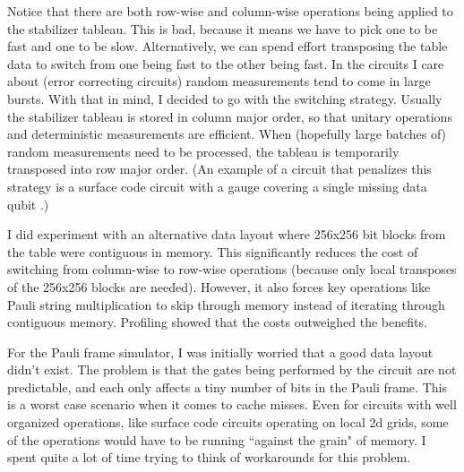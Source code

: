 \documentclass[onecolumn,unpublished]{quantumarticle}
\theoremstyle{definition}
\theoremstyle{definition}
\theoremstyle{definition}
\begin{document}
Notice that there are both row-wise and column-wise operations being applied to the stabilizer tableau.
This is bad, because it means we have to pick one to be fast and one to be slow.
Alternatively, we can spend effort transposing the table data to switch from one being fast to the other being fast.
In the circuits I care about (error correcting circuits) random measurements tend to come in large bursts.
With that in mind, I decided to go with the switching strategy.
Usually the stabilizer tableau is stored in column major order, so that unitary operations and deterministic measurements are efficient.
When (hopefully large batches of) random measurements need to be processed, the tableau is temporarily transposed into row major order.
(An example of a circuit that penalizes this strategy is a surface code circuit with a gauge covering a single missing data qubit \cite{nagayama2017surfacegauge}.)

I did experiment with an alternative data layout where 256x256 bit blocks from the table were contiguous in memory.
This significantly reduces the cost of switching from column-wise to row-wise operations (because only local transposes of the 256x256 blocks are needed).
However, it also forces key operations like Pauli string multiplication to skip through memory instead of iterating through contiguous memory.
Profiling showed that the costs outweighed the benefits.

For the Pauli frame simulator, I was initially worried that a good data layout didn't exist.
The problem is that the gates being performed by the circuit are not predictable, and each only affects a tiny number of bits in the Pauli frame.
This is a worst case scenario when it comes to cache misses.
Even for circuits with well organized operations, like surface code circuits operating on local 2d grids, some of the operations would have to be running ``against the grain" of memory.
I spent quite a lot of time trying to think of workarounds for this problem.
\end{document}
